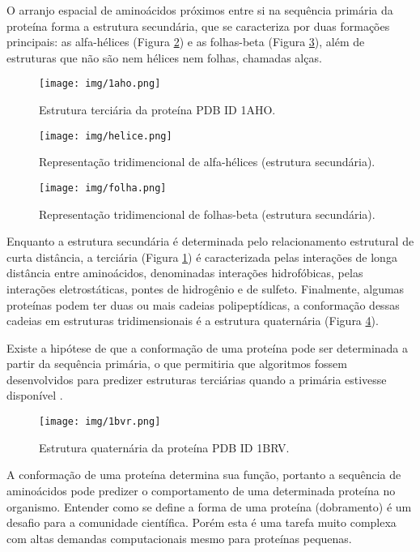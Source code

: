 \documentclass[dm,ppgcomp]{texfurg}
\begin{document}
O arranjo espacial de aminoácidos próximos entre si na sequência primária da proteína forma a estrutura secundária, que se caracteriza por duas formações principais: as alfa-hélices (Figura \ref{helice}) e as folhas-beta (Figura \ref{folha}), além de estruturas que não são nem hélices nem folhas, chamadas alças. 

\begin{figure}[htbp]
  \centering \texttt{[image: img/1aho.png]}
\caption{Estrutura terciária da proteína PDB ID 1AHO.} 
\label{1ahoimg}
\end{figure}

\begin{figure}[htbp]
  \centering \texttt{[image: img/helice.png]}
\caption{Representação tridimencional de alfa-hélices (estrutura secundária).} 
\label{helice}
\end{figure}

\begin{figure}[htbp]
  \centering \texttt{[image: img/folha.png]}
\caption{Representação tridimencional de folhas-beta (estrutura secundária).} 
\label{folha}
\end{figure}

Enquanto a estrutura secundária é determinada pelo relacionamento estrutural de curta distância, a terciária (Figura \ref{1ahoimg}) é caracterizada pelas interações de longa distância entre aminoácidos, denominadas interações hidrofóbicas, pelas interações eletrostáticas, pontes de hidrogênio e de sulfeto. Finalmente, algumas proteínas podem ter duas ou mais cadeias polipeptídicas, a conformação dessas cadeias em estruturas tridimensionais é a estrutura quaternária (Figura \ref{1bvrimg}).

Existe a hipótese de que a conformação de uma proteína pode ser determinada a partir da sequência primária, o que permitiria que algoritmos fossem desenvolvidos para predizer estruturas terciárias quando a primária estivesse disponível \cite{anfinsen1973principles}. 

\begin{figure}[htbp]
  \centering \texttt{[image: img/1bvr.png]}
\caption{Estrutura quaternária da proteína PDB ID 1BRV.} 
\label{1bvrimg}
\end{figure}

A conformação de uma proteína determina sua função, portanto a sequência de aminoácidos pode predizer o comportamento de uma determinada proteína no organismo. Entender como se define a forma de uma proteína (dobramento) é um desafio para a comunidade científica. Porém esta é uma tarefa muito complexa com altas demandas computacionais mesmo para proteínas pequenas. 
\end{document}
